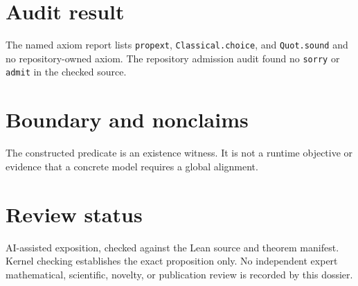\documentclass[11pt]{article}
\begin{document}
\section{Audit result}
The named axiom report lists \texttt{propext}, \texttt{Classical.choice}, and
\texttt{Quot.sound} and no repository-owned axiom.  The repository admission audit found no
\texttt{sorry} or \texttt{admit} in the checked source.

\section{Boundary and nonclaims}
The constructed predicate is an existence witness.  It is not a runtime objective or evidence that a concrete model requires a global alignment.

\section{Review status}
AI-assisted exposition, checked against the Lean source and theorem manifest.  Kernel checking
establishes the exact proposition only.  No independent expert mathematical, scientific,
novelty, or publication review is recorded by this dossier.
\end{document}
